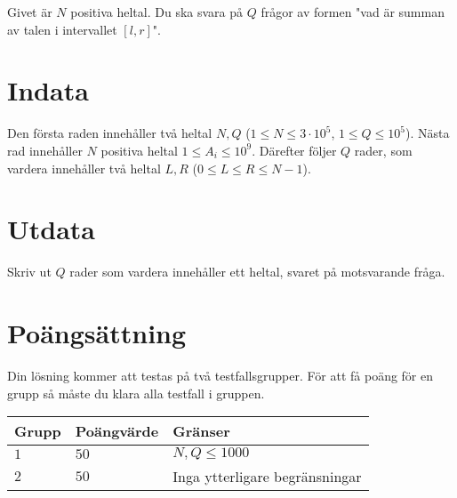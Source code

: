 Givet är $N$ positiva heltal. Du ska svara på $Q$ frågor av formen "vad är summan av talen i intervallet $[l,r]$".

\section*{Indata}
Den första raden innehåller två heltal $N, Q$ ($1 \leq N \leq 3 \cdot 10^5$, $1 \leq Q \leq 10^5$).
Nästa rad innehåller $N$ positiva heltal $1 \leq A_i \leq 10^9$.
Därefter följer $Q$ rader, som vardera innehåller två heltal $L,R$ ($0 \leq L \leq R \leq N-1$).

\section*{Utdata}
Skriv ut $Q$ rader som vardera innehåller ett heltal, svaret på motsvarande fråga.

\section*{Poängsättning}
Din lösning kommer att testas på två testfallsgrupper.
\noindent
För att få poäng för en grupp så måste du klara alla testfall i gruppen.

\noindent
\begin{tabular}{| l | l | l |}
\hline
  Grupp & Poängvärde & Gränser \\ \hline
  $1$    & $50$       &  $N,Q \leq 1000$ \\ \hline
  $2$    & $50$       &  Inga ytterligare begränsningar \\ \hline
\end{tabular}
